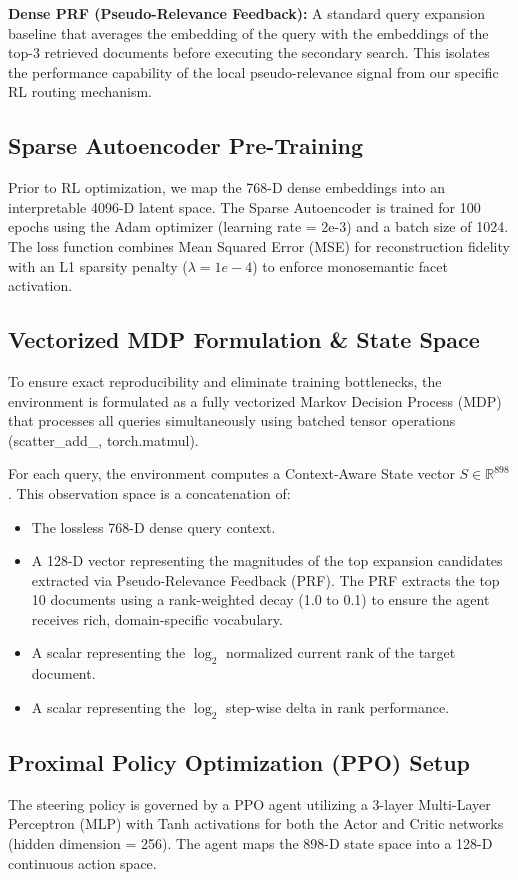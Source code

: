 \textbf{Dense PRF (Pseudo-Relevance Feedback):} A standard query expansion baseline that averages the embedding of the query with the embeddings of the top-3 retrieved documents before executing the secondary search. This isolates the performance capability of the local pseudo-relevance signal from our specific RL routing mechanism.

\subsection{Sparse Autoencoder Pre-Training}
Prior to RL optimization, we map the 768-D dense embeddings into an interpretable 4096-D latent space. The Sparse Autoencoder is trained for 100 epochs using the Adam optimizer (learning rate = 2e-3) and a batch size of 1024. The loss function combines Mean Squared Error (MSE) for reconstruction fidelity with an L1 sparsity penalty ($\lambda = 1e-4$) to enforce monosemantic facet activation.

\subsection{Vectorized MDP Formulation \& State Space}
To ensure exact reproducibility and eliminate training bottlenecks, the environment is formulated as a fully vectorized Markov Decision Process (MDP) that processes all queries simultaneously using batched tensor operations (scatter\_add\_, torch.matmul).

For each query, the environment computes a Context-Aware State vector $S \in \mathbb{R}^{898}$. This observation space is a concatenation of:
\begin{itemize}
    \item The lossless 768-D dense query context.
    \item A 128-D vector representing the magnitudes of the top expansion candidates extracted via Pseudo-Relevance Feedback (PRF). The PRF extracts the top 10 documents using a rank-weighted decay (1.0 to 0.1) to ensure the agent receives rich, domain-specific vocabulary.
    \item A scalar representing the $\log_{2}$ normalized current rank of the target document.
    \item A scalar representing the $\log_{2}$ step-wise delta in rank performance.
\end{itemize}

\subsection{Proximal Policy Optimization (PPO) Setup}
The steering policy is governed by a PPO agent utilizing a 3-layer Multi-Layer Perceptron (MLP) with Tanh activations for both the Actor and Critic networks (hidden dimension = 256). The agent maps the 898-D state space into a 128-D continuous action space.

